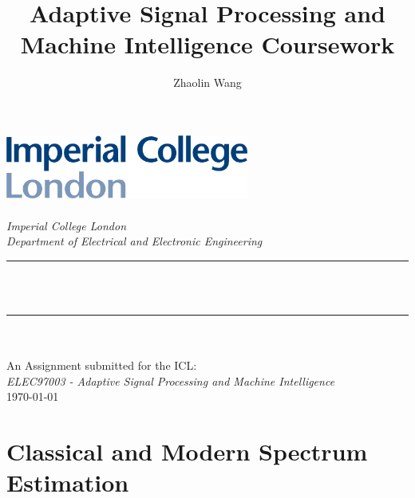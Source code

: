 \documentclass[10pt]{article}
\title{Adaptive Signal Processing and Machine Intelligence Coursework}
\author{\textup{Zhaolin Wang}}
\begin{document}
\begin{titlepage}
	\newcommand{\HRule}{\rule{\linewidth}{0.5mm}}
	\includegraphics[width=8cm]{logo_imperial_college_london.png}\\[1cm] 
	\center 
	\quad\\[1.5cm]
	\textsl{\Large Imperial College London }\\[0.5cm] 
	\textsl{\large Department of Electrical and Electronic Engineering}\\[0.5cm] 
	\makeatletter
	\HRule \\[0.4cm]
	{ \huge \bfseries \@title}\\[0.4cm] 
	\HRule \\[1.5cm]
	\Large \@author \\[0.5cm]
	\makeatother
	{\large An Assignment submitted for the ICL:}\\[0.5cm]
	{\large \emph{ELEC97003 - Adaptive Signal Processing and Machine Intelligence}}\\[0.5cm]
	{\large \today}\\[2cm] 
	\vfill 
\end{titlepage}

\tableofcontents
\newpage

\section{Classical and Modern Spectrum Estimation}
\end{document}
